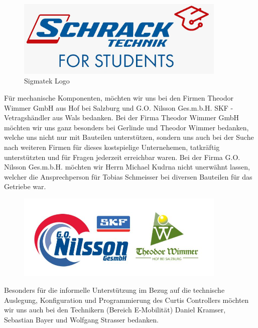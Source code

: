 \begin{figure}[H]
	\begin{center}
		\includegraphics[width=10cm]{figures/allgemein/Schrack_Logo.jpg}
		\caption{Sigmatek Logo}
	\end{center}
\end{figure}

Für mechanische Komponenten, möchten wir uns bei den Firmen Theodor Wimmer GmbH aus Hof bei Salzburg und G.O. Nilsson Ges.m.b.H. SKF - Vetragshändler aus Wals bedanken. Bei der Firma Theodor Wimmer GmbH möchten wir uns ganz besonders bei Gerlinde und Theodor Wimmer bedanken, welche uns nicht nur mit Bauteilen unterstützen, sondern uns auch bei der Suche nach weiteren Firmen für dieses kostspielige Unternehemen, tatkräftig unterstützten und für Fragen jederzeit erreichbar waren. Bei der Firma G.O. Nilsson Ges.m.b.H. möchten wir Herrn Michael Kudrna nicht unerwähnt lassen, welcher die Ansprechperson für Tobias Schmeisser bei diversen Bauteilen für das Getriebe war.

\begin{figure} [H]
	\begin{center}
		\includegraphics[width=10cm]{figures/mechanik/Sponsoren.jpg}		
	\end{center}
\end{figure}
	
Besonders für die informelle Unterstützung im Bezug auf die technische Auslegung, Konfiguration und Programmierung des Curtis Controllers möchten wir uns auch bei den Technikern (Bereich E-Mobilität) Daniel Kramser, Sebastian Bayer und Wolfgang Strasser bedanken.

\newpage


\vspace{0,5cm}
	
